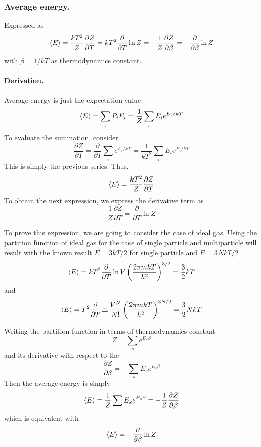 \documentclass[../../../Main.tex]{subfiles}
\begin{document}
\subsubsection{Average energy.} Expressed as
\begin{equation*}
	\braket{E}=\frac{kT^2}{Z}\frac{\partial Z}{\partial T}=kT^2\frac{\partial}{\partial T}\ln Z=-\frac{1}{Z}\frac{\partial Z}{\partial \beta}=-\frac{\partial}{\partial \beta}\ln Z
\end{equation*}
with $\beta=1/kT$ as thermodynamics constant.

\paragraph{Derivation.} Average energy is just the expectation value
\begin{equation*}
	\braket{E}=\sum_{_i}P_iE_i=\frac{1}{Z}\sum_{_i}E_ie^{E_i/kT}
\end{equation*}
To evaluate the summation, consider
\begin{equation*}
	\frac{\partial Z}{\partial T}=\frac{\partial}{\partial T}\sum_i e^{E_i/kT}=\frac{1}{kT^2}\sum_i E_ie^{E_i/kT}
\end{equation*}
This is simply the previous series. Thus,
\begin{equation*}
	\braket{E}=\frac{kT^2}{Z}\frac{\partial Z}{\partial T}
\end{equation*}
To obtain the next expression, we express the derivative term as
\begin{equation*}
	\frac{1}{Z}\frac{\partial Z}{\partial T}=\frac{\partial }{\partial T}\ln Z
\end{equation*}

To prove this expression, we are going to consider the case of ideal gas. Using the partition function of ideal gas for the case of single particle and multiparticle will result with the known result $E=3kT/2$ for single particle and $E=3NkT/2$
\begin{equation*}
	\braket{E}=kT^2\frac{\partial}{\partial T}\ln V\left(\frac{2\pi mkT}{h^2}\right)^{3/2}=\frac{3}{2}kT
\end{equation*}
and
\begin{equation*}
	\braket{E}=T^2\frac{\partial}{\partial T}\ln \frac{V^N}{N!}\left(\frac{2\pi mkT}{h^2}\right)^{3N/2}=\frac{3}{2}NkT
\end{equation*}

Writing the partition function in terms of thermodynamics constant
\begin{equation*}
	Z=\sum_se^{E_s\beta}
\end{equation*}
and its derivative with respect to the
\begin{equation*}
	\frac{\partial Z}{\partial \beta}=-\sum_sE_se^{E_s\beta}
\end{equation*}
Then the average energy is  simply
\begin{equation*}
	\braket{E}=\frac{1}{Z}\sum E_se^{E_s\beta}=-\frac{1}{Z}\frac{\partial Z}{\partial\beta}
\end{equation*}
which is equivalent with 
\begin{equation*}
	\braket{E}=-\frac{\partial}{\partial \beta}\ln Z
\end{equation*}
\end{document}
